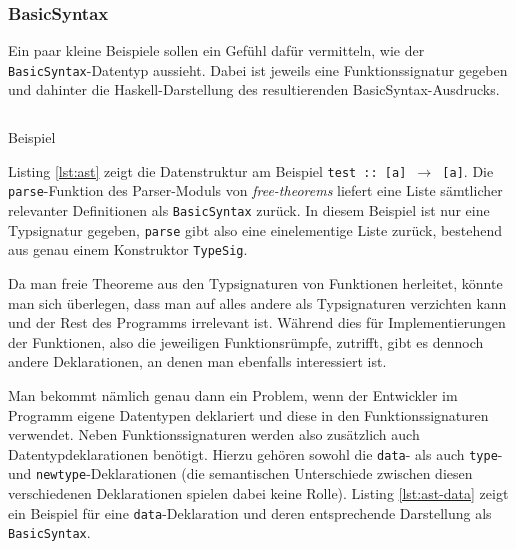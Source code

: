 

\subsubsection{BasicSyntax}

Ein paar kleine Beispiele sollen ein Gefühl dafür vermitteln, wie der \texttt{BasicSyntax}-Datentyp aussieht. Dabei ist jeweils
eine Funktionssignatur gegeben und dahinter die Haskell-Darstellung des resultierenden BasicSyntax-Ausdrucks.

\begin{listing}[ht]
\inputminted[tabsize=2]{haskell}{ast.hs}
\caption{Beispiel}
\label{lst:ast}
\end{listing}

Listing \ref{lst:ast} zeigt die Datenstruktur am Beispiel \texttt{test :: [a] $\rightarrow$ [a]}. Die \texttt{parse}-Funktion des Parser-Moduls von \textit{free-theorems} liefert eine Liste sämtlicher relevanter Definitionen als \texttt{BasicSyntax} zurück.
In diesem Beispiel ist nur eine Typsignatur gegeben, \texttt{parse} gibt also eine einelementige Liste zurück, bestehend aus
genau einem Konstruktor \texttt{TypeSig}.

Da man freie Theoreme aus den Typsignaturen von Funktionen herleitet, könnte man sich überlegen, dass man auf alles andere
als Typsignaturen verzichten kann und der Rest des Programms irrelevant ist. Während dies für Implementierungen der Funktionen,
also die jeweiligen Funktionsrümpfe, zutrifft, gibt es dennoch andere Deklarationen, an denen man ebenfalls interessiert ist.

Man bekommt nämlich genau dann ein Problem, wenn der Entwickler im Programm eigene Datentypen deklariert und diese in
den Funktionssignaturen verwendet. Neben Funktionssignaturen werden also zusätzlich auch Datentypdeklarationen benötigt.
Hierzu gehören sowohl die \texttt{data}- als auch \texttt{type}- und \texttt{newtype}-Deklarationen (die semantischen Unterschiede
zwischen diesen verschiedenen Deklarationen spielen dabei keine Rolle). Listing \ref{lst:ast-data} zeigt ein Beispiel für eine
\texttt{data}-Deklaration und deren entsprechende Darstellung als \texttt{BasicSyntax}.

